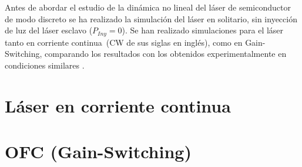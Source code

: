 \graphicspath{{../Graphics/Cpt1-Charactz/}}

\newcommand{\cw}{corriente continua}

Antes de abordar el estudio de la dinámica no lineal del láser de semiconductor de modo discreto se ha realizado la simulación del láser en solitario, sin inyección de luz del láser esclavo ($P_{Iny} = 0$). Se han realizado simulaciones para el láser tanto en \cw\ (CW de sus siglas en inglés), como en Gain-Switching, comparando los resultados con los obtenidos experimentalmente en condiciones similares \cite{Chaves19}.

	\section{Láser en \cw}
		\label{Sol:CW}
		
		

	\section{OFC (Gain-Switching)}
		\label{Sol:OFC}

		

